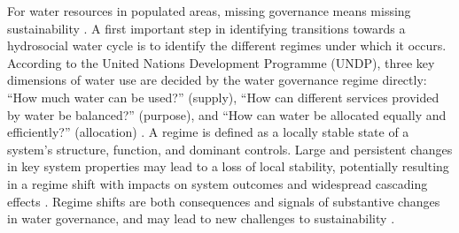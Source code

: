 \documentclass[9pt, twocolumn, twoside, lineno]{pnas-new}
\begin{document}
\label{introduction-section-2}
For water resources in populated areas, missing governance means missing sustainability \cite{undpwatergovernancefacility2015}.
A first important step in identifying transitions towards a hydrosocial water cycle is to identify the different regimes under which it occurs.
According to the United Nations Development Programme (UNDP), three key dimensions of water use are decided by the water governance regime directly: ``How much water can be used?'' (supply), ``How can different services provided by water be balanced?'' (purpose), and ``How can water be allocated equally and efficiently?'' (allocation)
\cite{undpwatergovernancefacility2013,undpwatergovernancefacility2015,undpwatergovernancefacility2016}.
A regime is defined as a locally stable state of a system’s structure, function, and dominant controls. 
Large and persistent changes in key system properties may lead to a loss of local stability, potentially resulting in a regime shift with impacts on system outcomes and widespread cascading effects
\cite{rocha2018,gregr2020}.
Regime shifts are both consequences and signals of substantive changes in water governance, and may lead to new challenges to sustainability
\cite{steffen2020}.
\end{document}
